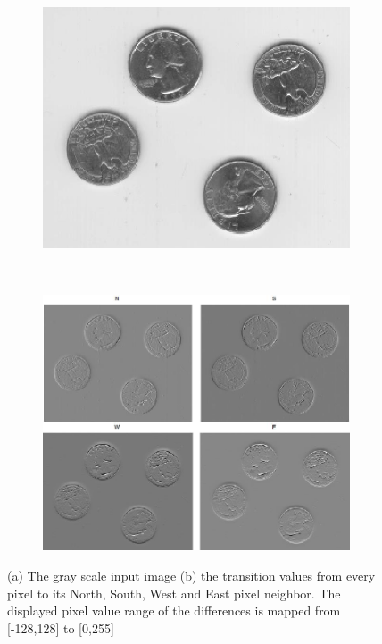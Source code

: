 \documentclass[12pt]{article}
\begin{document}
\begin{figure}[tb]
  \centering

  \begin{subfigure}[b]{0.46\textwidth}
        \includegraphics[width=\textwidth]{img/values_init.jpg}
        \caption{}\label{fig:dart_values_init}
    \end{subfigure}
    ~
    \begin{subfigure}[b]{0.45\textwidth}
        \includegraphics[width=\textwidth]{img/values_new.jpg}
        \caption{}\label{fig:dart_values_news}
    \end{subfigure}

  \caption{(a) The gray scale input image (b) the transition values from every pixel to its North, South, West and East pixel neighbor. The displayed pixel value range of the differences is mapped from [-128,128] to [0,255]}\label{fig:dart_values}
\end{figure}
\end{document}
